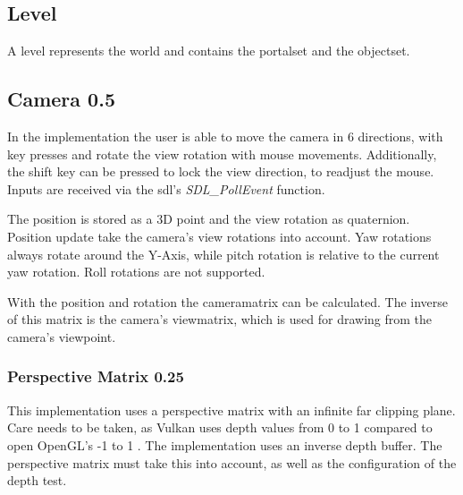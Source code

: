 





\subsection{Level}
A level represents the world and contains the \gls{portalset} and the \gls{objectset}.



\subsection{Camera 0.5}
In the implementation the user is able to move the camera in 6 directions, with key presses and rotate the view rotation with mouse movements. Additionally, the shift key can be pressed to lock the view direction, to readjust the mouse. Inputs are received via the \gls{sdl}'s \cite{sdl} \textit{SDL\_PollEvent} function.

The position is stored as a 3D point and the view rotation as quaternion. Position update take the camera's view rotations into account. Yaw rotations always rotate around the Y-Axis, while pitch rotation is relative to the current yaw rotation. Roll rotations are not supported.

With the position and rotation the \gls{cameramatrix} can be calculated. The inverse of this matrix is the camera's \gls{viewmatrix}, which is used for drawing from the camera's viewpoint.

\subsubsection{Perspective Matrix 0.25}
This implementation uses a perspective matrix with an infinite far clipping plane. Care needs to be taken, as Vulkan uses depth values from 0 to 1 \cite{khronos:vulkan:spec1.1} compared to open OpenGL's -1 to 1 \cite{khronos:openGL:spec4.6}. The implementation uses an inverse depth buffer. The perspective matrix must take this into account, as well as the configuration of the depth test.





